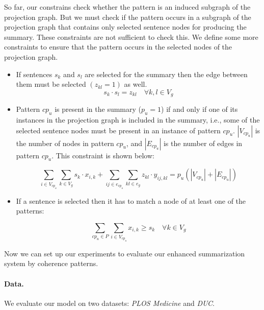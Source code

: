 So far, our constrains check whether the pattern is an induced subgraph of the projection graph. 
But we must check if the pattern occurs in a subgraph of the projection graph that contains only selected sentence nodes for producing the summary. 
These constraints are not sufficient to check this. 
We define some more constraints to ensure that the pattern occurs in the selected nodes of the projection graph. 


\begin{itemize}

\item If sentences $s_{k}$ and $s_{l}$ are selected for the summary then the edge between them must be selected $(z_{kl}=1)$ as well.
\begin{equation}
 s_{k} \cdot s_{l}=z_{kl} \quad \forall k,l \in V_{g}
\end{equation}

\item Pattern $cp_u$ is present in the summary ($p_u=1$) if and only if one of its instances in the projection graph is included in the summary, i.e., some of the selected sentence nodes must be present in an instance of pattern $cp_{u}$.
$|V_{cp_{u}}|$ is the number of nodes in pattern $cp_{u}$, and $|E_{cp_u}|$ is the number of edges in pattern $cp_{u}$.
This constraint is shown below:

\begin{equation}
\underset{i \in V_{cp_u}}{\sum} \underset{k \in V_g}{\sum} s_k \cdot x_{i,k}+\underset{ij \in e_{cp_u}}{\sum} \underset{kl \in e_g}{\sum} z_{kl} \cdot y_{ij,kl} = p_{u}(|V_{cp_u}|+|E_{cp_u}|)
\end{equation}

\item If a sentence is selected then it has to match a node of at least one of the patterns:

\begin{equation}
\sum_{cp_{u} \in P} \sum_{i \in V_{cp_{u}}} x_{i,k} \geq s_{k} \quad \forall k \in V_{g}
 \end{equation}
\end{itemize}

Now we can set up our experiments to evaluate our enhanced  summarization system by coherence patterns. 

\paragraph{Data. }
We evaluate our model on two datasets:  \emph{PLOS Medicine} and \emph{DUC}. 


